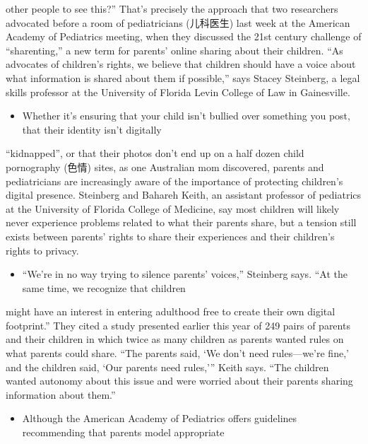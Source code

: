 \documentclass[UTF8,11pt]{ctexart}
\begin{document}
other people to see this?” That’s precisely the approach that two researchers advocated before a room of pediatricians (儿科医生) last week at the American Academy of Pediatrics meeting, when they discussed the 21st century challenge of “sharenting,” a new term for parents’ online sharing about their children. “As advocates of children’s rights, we believe that children should have a voice about what information is shared about them if possible,” says Stacey Steinberg, a legal skills professor at the University of Florida Levin College of Law in Gainesville.


\begin{itemize}[leftmargin=2em,itemsep=.2em,topsep=.4em]\item[D.] Whether it’s ensuring that your child isn’t bullied over something you post, that their identity isn’t digitally
\end{itemize}

“kidnapped”, or that their photos don’t end up on a half dozen child pornography (色情) sites, as one Australian mom discovered, parents and pediatricians are increasingly aware of the importance of protecting children’s digital presence. Steinberg and Bahareh Keith, an assistant professor of pediatrics at the University of Florida College of Medicine, say most children will likely never experience problems related to what their parents share, but a tension still exists between parents’ rights to share their experiences and their children’s rights to privacy.


\begin{itemize}[leftmargin=2em,itemsep=.2em,topsep=.4em]\item[E.] “We’re in no way trying to silence parents’ voices,” Steinberg says. “At the same time, we recognize that children
\end{itemize}

might have an interest in entering adulthood free to create their own digital footprint.” They cited a study presented earlier this year of 249 pairs of parents and their children in which twice as many children as parents wanted rules on what parents could share. “The parents said, ‘We don’t need rules—we’re fine,’ and the children said, ‘Our parents need rules,’” Keith says. “The children wanted autonomy about this issue and were worried about their parents sharing information about them.”


\begin{itemize}[leftmargin=2em,itemsep=.2em,topsep=.4em]\item[F.] Although the American Academy of Pediatrics offers guidelines recommending that parents model appropriate
\end{itemize}
\end{document}
